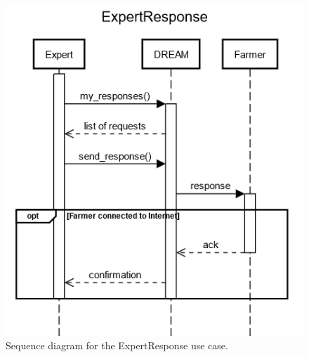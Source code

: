 \documentclass{article}
\begin{document}
\begin{figure}[H]
    \centering
    \includegraphics[scale=0.75]{sequence_diagrams/ExpertResponse.png}
    \caption{Sequence diagram for the ExpertResponse use case.}
\end{figure}
\newpage
\end{document}
